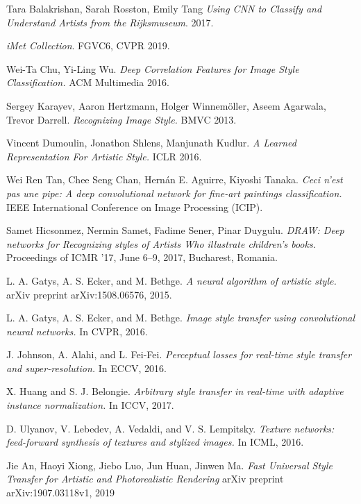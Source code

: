 \documentclass[10pt,twocolumn,letterpaper]{article}
\begin{document}
{\small


\begin{thebibliography}{9}

Tara Balakrishan, Sarah Rosston, Emily Tang
\textit{Using CNN to Classify and Understand Artists from the Rijksmuseum}. 
2017.


\textit{iMet Collection}. 
 FGVC6, CVPR 2019.

Wei-Ta Chu, Yi-Ling Wu.
\textit{Deep Correlation Features for Image Style Classification.}
ACM Multimedia 2016.

Sergey Karayev, Aaron Hertzmann, Holger Winnemöller, Aseem Agarwala, Trevor Darrell.
\textit{Recognizing Image Style.}
BMVC 2013.

Vincent Dumoulin, Jonathon Shlens, Manjunath Kudlur.
\textit{A Learned Representation For Artistic Style.}
ICLR 2016.

Wei Ren Tan, Chee Seng Chan, Hernán E. Aguirre, Kiyoshi Tanaka.
\textit{Ceci n'est pas une pipe: A deep convolutional network for fine-art paintings classification.}
IEEE International Conference on Image Processing (ICIP).

Samet Hicsonmez, Nermin Samet, Fadime Sener, Pinar Duygulu.
\textit{DRAW: Deep networks for Recognizing styles of Artists Who illustrate children's books.}
Proceedings of ICMR ’17, June 6–9, 2017, Bucharest, Romania.

L. A. Gatys, A. S. Ecker, and M. Bethge.
\textit{A neural algorithm of artistic style.}
arXiv preprint arXiv:1508.06576, 2015.

L. A. Gatys, A. S. Ecker, and M. Bethge.
\textit{Image style transfer using convolutional neural networks.}
In CVPR, 2016.

J. Johnson, A. Alahi, and L. Fei-Fei.
\textit{ Perceptual losses for real-time style transfer and super-resolution.}
In ECCV, 2016.

X. Huang and S. J. Belongie.
\textit{Arbitrary style transfer in real-time with adaptive instance normalization.}
In ICCV, 2017.

D. Ulyanov, V. Lebedev, A. Vedaldi, and V. S. Lempitsky.
\textit{Texture networks: feed-forward synthesis of textures and stylized images.}
In ICML, 2016.

Jie An, Haoyi Xiong, Jiebo Luo, Jun Huan, Jinwen Ma.
\textit{Fast Universal Style Transfer for Artistic and Photorealistic Rendering}
arXiv preprint arXiv:1907.03118v1, 2019



\end{thebibliography}
}
\end{document}
